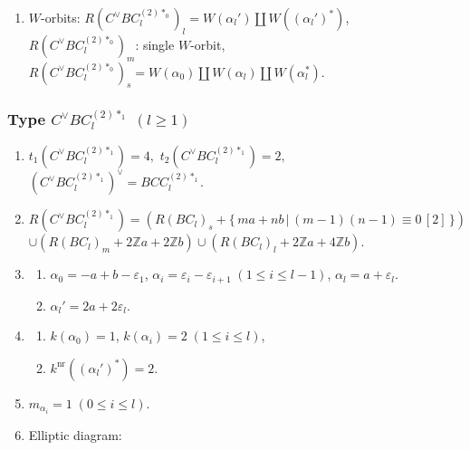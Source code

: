 \documentclass[11pt]{amsart}
\newcommand{\Z}{\mathbb{Z}}
\newcommand{\nr}{\mathrm{nr}}
\newcommand{\vep}{\varepsilon}
\begin{document}
{\begin{enumerate}
\begin{center}
{}
\end{center}
\item $W$-orbits: 
$R(C^\vee BC_l^{(2)\ast_0})_l=W(\alpha_l') \amalg W((\alpha_l')^\ast)$, \\
\phantom{$W$-orbits:}  $R(C^\vee BC_l^{(2)\ast_0})_m$: single $W$-orbit, \\
\phantom{$W$-orbits:} 
$R(C^\vee BC_l^{(2)\ast_0})_s=W(\alpha_0) \amalg W(\alpha_l) \amalg W(\alpha_l^\ast)$.
\end{enumerate}

\subsubsection{Type $C^\vee BC_l^{(2)\ast_1}$ $(l\geq 1)$}\label{data:CBC-5}
\begin{enumerate}
\item $t_1(C^\vee BC_l^{(2)\ast_1})=4,$ \quad $t_2(C^\vee BC_l^{(2)\ast_1})=2,$ \quad $(C^\vee BC_l^{(2)\ast_1})^\vee = BCC_l^{(2)\ast_1}.$
\item $R(C^\vee BC_l^{(2)\ast_1})=(R(BC_l)_s+\{\, ma+nb\, \vert\, (m-1)(n-1) \equiv 0\, [2]\, \})$ \\
 $\cup (R(BC_l)_m+2\Z a+2\Z b) \cup (R(BC_l)_l+2\Z a+4\Z b)$. 
\item
\begin{enumerate}
\item[i)] $\alpha_0=-a+b-\vep_1$, $\alpha_i=\vep_i-\vep_{i+1}\; 
(1\leq i\leq l-1)$, $\alpha_l=a+\vep_l$. 
\item[ii)] $\alpha_l'=2a+2\vep_l$.
\end{enumerate}
\item 
\begin{enumerate}
\item[i)] $k(\alpha_0)=1$, \; $k(\alpha_i)=2\; (1\leq i\leq l)$, 
\item[ii)] $k^{\nr}((\alpha_l')^\ast)=2$. 
\end{enumerate}
\item $m_{\alpha_i}=1\; (0\leq i \leq l)$.
\item Elliptic diagram:





\end{enumerate}}
\end{document}
